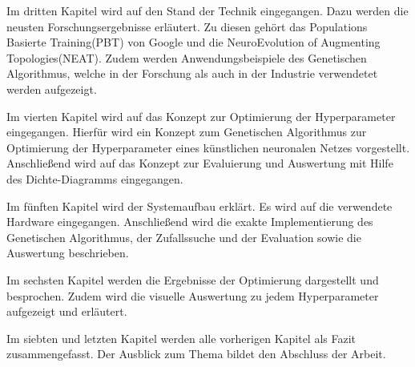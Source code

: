 Im dritten Kapitel wird auf den Stand der Technik eingegangen. Dazu werden die neusten Forschungsergebnisse erläutert. Zu diesen gehört das Populations Basierte Training(PBT) von Google und die NeuroEvolution of Augmenting Topologies(NEAT). Zudem werden Anwendungsbeispiele des Genetischen Algorithmus, welche in der Forschung als auch in der Industrie verwendetet werden aufgezeigt. 

Im vierten Kapitel wird auf das Konzept zur Optimierung der Hyperparameter eingegangen. Hierfür wird ein Konzept zum Genetischen Algorithmus zur Optimierung der Hyperparameter eines künstlichen neuronalen Netzes vorgestellt. Anschließend wird auf das Konzept zur Evaluierung und Auswertung mit Hilfe des Dichte-Diagramms eingegangen. 

Im fünften Kapitel wird der Systemaufbau erklärt. Es wird auf die verwendete Hardware eingegangen. Anschließend wird die exakte Implementierung des Genetischen Algorithmus, der Zufallssuche und der Evaluation sowie die Auswertung beschrieben.

Im sechsten Kapitel werden die Ergebnisse der Optimierung dargestellt und besprochen. Zudem wird die visuelle Auswertung zu jedem Hyperparameter aufgezeigt und erläutert. 

Im siebten und letzten Kapitel werden alle vorherigen Kapitel als Fazit zusammengefasst. Der Ausblick zum Thema bildet den Abschluss der Arbeit. 


